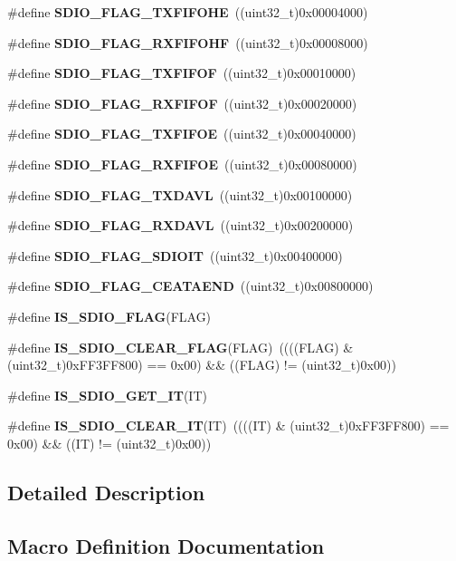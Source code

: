 \begin{DoxyCompactItemize}
\item 
\#define \textbf{ S\+D\+I\+O\+\_\+\+F\+L\+A\+G\+\_\+\+T\+X\+F\+I\+F\+O\+HE}~((uint32\+\_\+t)0x00004000)
\item 
\#define \textbf{ S\+D\+I\+O\+\_\+\+F\+L\+A\+G\+\_\+\+R\+X\+F\+I\+F\+O\+HF}~((uint32\+\_\+t)0x00008000)
\item 
\#define \textbf{ S\+D\+I\+O\+\_\+\+F\+L\+A\+G\+\_\+\+T\+X\+F\+I\+F\+OF}~((uint32\+\_\+t)0x00010000)
\item 
\#define \textbf{ S\+D\+I\+O\+\_\+\+F\+L\+A\+G\+\_\+\+R\+X\+F\+I\+F\+OF}~((uint32\+\_\+t)0x00020000)
\item 
\#define \textbf{ S\+D\+I\+O\+\_\+\+F\+L\+A\+G\+\_\+\+T\+X\+F\+I\+F\+OE}~((uint32\+\_\+t)0x00040000)
\item 
\#define \textbf{ S\+D\+I\+O\+\_\+\+F\+L\+A\+G\+\_\+\+R\+X\+F\+I\+F\+OE}~((uint32\+\_\+t)0x00080000)
\item 
\#define \textbf{ S\+D\+I\+O\+\_\+\+F\+L\+A\+G\+\_\+\+T\+X\+D\+A\+VL}~((uint32\+\_\+t)0x00100000)
\item 
\#define \textbf{ S\+D\+I\+O\+\_\+\+F\+L\+A\+G\+\_\+\+R\+X\+D\+A\+VL}~((uint32\+\_\+t)0x00200000)
\item 
\#define \textbf{ S\+D\+I\+O\+\_\+\+F\+L\+A\+G\+\_\+\+S\+D\+I\+O\+IT}~((uint32\+\_\+t)0x00400000)
\item 
\#define \textbf{ S\+D\+I\+O\+\_\+\+F\+L\+A\+G\+\_\+\+C\+E\+A\+T\+A\+E\+ND}~((uint32\+\_\+t)0x00800000)
\item 
\#define \textbf{ I\+S\+\_\+\+S\+D\+I\+O\+\_\+\+F\+L\+AG}(F\+L\+AG)
\item 
\#define \textbf{ I\+S\+\_\+\+S\+D\+I\+O\+\_\+\+C\+L\+E\+A\+R\+\_\+\+F\+L\+AG}(F\+L\+AG)~((((F\+L\+AG) \& (uint32\+\_\+t)0x\+F\+F3\+F\+F800) == 0x00) \&\& ((\+F\+L\+A\+G) != (uint32\+\_\+t)0x00))
\item 
\#define \textbf{ I\+S\+\_\+\+S\+D\+I\+O\+\_\+\+G\+E\+T\+\_\+\+IT}(IT)
\item 
\#define \textbf{ I\+S\+\_\+\+S\+D\+I\+O\+\_\+\+C\+L\+E\+A\+R\+\_\+\+IT}(IT)~((((IT) \& (uint32\+\_\+t)0x\+F\+F3\+F\+F800) == 0x00) \&\& ((\+I\+T) != (uint32\+\_\+t)0x00))
\end{DoxyCompactItemize}


\subsection{Detailed Description}


\subsection{Macro Definition Documentation}
\mbox{\label{group__SDIO__Flags_ga8a093bc0b51901676fd5da7087d8ab3a}} 

